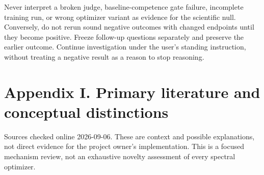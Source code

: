 \documentclass[
  british,
  10pt,
  a4paper,
]{article}
\begin{document}
Never interpret a broken judge, baseline-\allowbreak{}competence gate
failure, incomplete training run, or wrong optimizer variant as evidence
for the scientific null. Conversely,\allowbreak{} do not rerun sound
negative outcomes with changed endpoints until they become positive.
Freeze follow-up questions separately and preserve the earlier outcome.
Continue investigation under the user's standing
instruction,\allowbreak{} without treating a negative result as a reason
to stop reasoning.

\clearpage

\section{Appendix I. Primary literature and conceptual
distinctions}\label{primary-literature}

Sources checked online
2026-\allowbreak{}09-\allowbreak{}06.\allowbreak{} These are context and
possible explanations\allowbreak{},\allowbreak{} not direct evidence for
the project owner's implementati\allowbreak{}on.\allowbreak{} This is a focused
mechanism review, not an exhaustive novelty assessment of every spectral
optimizer.
\end{document}
